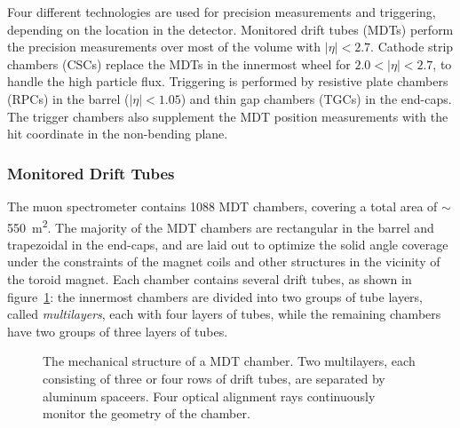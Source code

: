 Four different technologies are used for precision measurements and triggering, depending on the location in the detector. Monitored drift tubes (MDTs) perform the precision measurements over most of the volume with $|\eta|<2.7$. Cathode strip chambers (CSCs) replace the MDTs in the innermost wheel for $2.0<|\eta|<2.7$, to handle the high particle flux. Triggering is performed by resistive plate chambers (RPCs) in the barrel ($|\eta|<1.05$) and thin gap chambers (TGCs) in the end-caps. The trigger chambers also supplement the MDT position measurements with the hit coordinate in the non-bending plane. 

\subsubsection{Monitored Drift Tubes}
The muon spectrometer contains 1088 MDT chambers, covering a total area of $\sim$\SI{550}{\meter\tothe{2}}. The majority of the MDT chambers are rectangular in the barrel and trapezoidal in the end-caps, and are laid out to optimize the solid angle coverage under the constraints of the magnet coils and other structures in the vicinity of the toroid magnet. Each chamber contains several drift tubes, as shown in figure~\ref{fig:ATLAS-MS-MDT-chamber}: the innermost chambers are divided into two groups of tube layers, called \emph{multilayers}, each with four layers of tubes, while the remaining chambers have two groups of three layers of tubes. 

\begin{figure}[htbp]
	\centering
	\caption{The mechanical structure of a MDT chamber. Two multilayers, each consisting of three or four rows of drift tubes, are separated by aluminum spaceers. Four optical alignment rays continuously monitor the geometry of the chamber.}
	\label{fig:ATLAS-MS-MDT-chamber}
\end{figure}


